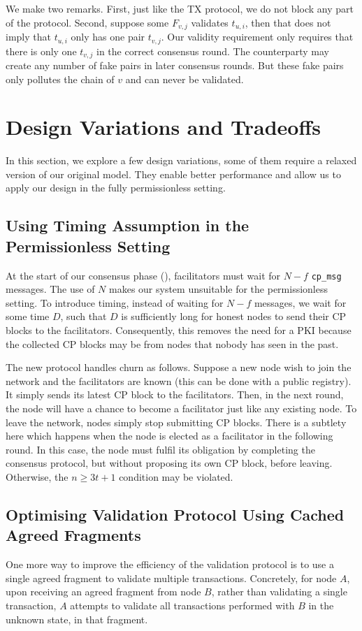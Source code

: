 We make two remarks.
First, just like the TX protocol, we do not block any part of the protocol.
Second, suppose some $F_{v, j}$ validates $t_{u, i}$, then that does not imply that $t_{u, i}$ only has one pair $t_{v, j}$.
Our validity requirement only requires that there is only one $t_{v, j}$ in the correct consensus round.
The counterparty may create any number of fake pairs in later consensus rounds.
But these fake pairs only pollutes the chain of $v$ and can never be validated.

\section{Design Variations and Tradeoffs}
\label{sec:tradeoffs}
In this section, 
we explore a few design variations, some of them require a relaxed version of our original model.
They enable better performance and allow us to apply our design in the fully permissionless setting.

\subsection{Using Timing Assumption in the Permissionless Setting}
\label{sec:permissionless}
At the start of our consensus phase (), facilitators must wait for $N-f$ \texttt{cp\_msg} messages.
The use of $N$ makes our system unsuitable for the permissionless setting.
To introduce timing, instead of waiting for $N-f$ messages, we wait for some time $D$,
such that $D$ is sufficiently long for honest nodes to send their CP blocks to the facilitators.
Consequently, this removes the need for a PKI because the collected CP blocks may be from nodes that nobody has seen in the past.

The new protocol handles churn as follows.
Suppose a new node wish to join the network and the facilitators are known (this can be done with a public registry).
It simply sends its latest CP block to the facilitators.
Then, in the next round, the node will have a chance to become a facilitator just like any existing node.
To leave the network, nodes simply stop submitting CP blocks.
There is a subtlety here which happens when the node is elected as a facilitator in the following round.
In this case, the node must fulfil its obligation by completing the consensus protocol, but without proposing its own CP block, before leaving.
Otherwise, the $n \ge 3t + 1$ condition may be violated.

\subsection{Optimising Validation Protocol Using Cached Agreed Fragments}
\label{sec:caching}
One more way to improve the efficiency of the validation protocol is to use a single agreed fragment to validate multiple transactions.
Concretely, for node $A$, upon receiving an agreed fragment from node $B$,
rather than validating a single transaction,
$A$ attempts to validate all transactions performed with $B$ in the unknown state, in that fragment.

